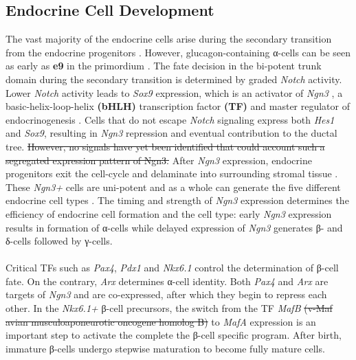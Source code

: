 \subsection{Endocrine Cell Development} %
\label{sec:endodev}
The vast majority of the endocrine cells arise during the secondary transition from the endocrine progenitors \textbf{\cite{pan_pancreas_2011}}. However, glucagon-containing α-cells can be seen as early as \textbf{e9} in the primordium \textbf{\cite{pictet_ultrastructural_1972,gittes_developmental_2009}}. The fate decision in the bi-potent trunk domain during the secondary transition is determined by graded \textit{Notch} activity. Lower \textit{Notch} activity leads to \textit{Sox9} expression, which is an activator of \textit{Ngn3} \textbf{\cite{shih_pancreas_2013}}, a basic-helix-loop-helix \textbf{(bHLH)} transcription factor \textbf{(TF)} and master regulator of endocrinogenesis \textbf{\cite{gu_direct_2002}}. Cells that do not escape \textit{Notch} signaling express both \textit{Hes1} and \textit{Sox9}, resulting in \textit{Ngn3} repression and eventual contribution to the ductal tree. \st{However, no signals have yet been identified that could account such a segregated expression pattern of Ngn3.} After \textit{Ngn3} expression, endocrine progenitors exit the cell-cycle and delaminate into surrounding stromal tissue \textbf{\cite{shih_pancreas_2013, gouzi_neurogenin3_2011, miyatsuka_neurogenin3_2011}}. These \textit{Ngn3+} cells are uni-potent and as a whole can generate the five different endocrine cell types \textbf{\cite{shih_pancreas_2013,gu_direct_2002,miyatsuka_neurogenin3_2011}}. The timing and strength of \textit{Ngn3} expression determines the efficiency of endocrine cell formation and the cell type: early \textit{Ngn3} expression results in formation of α-cells while delayed expression of \textit{Ngn3}  generates β- and δ-cells followed by γ-cells\textbf{\cite{johansson_temporal_2007}}.
\\\\
Critical TFs such as \textit{Pax4}, \textit{Pdx1} and \textit{Nkx6.1} control the determination of β-cell fate. On the contrary, \textit{Arx} determines α-cell identity. Both \textit{Pax4} and \textit{Arx} are targets of \textit{Ngn3} and are co-expressed, after which they begin to repress each other. In the \textit{Nkx6.1+} β-cell precursors, the switch from the TF \textit{MafB} \st{(v-Maf avian musculoaponeurotic oncogene homolog B)} to \textit{MafA} expression is an important step to activate the complete the β-cell specific program. After birth, immature β-cells undergo stepwise maturation to become fully mature cells.
\\\\
